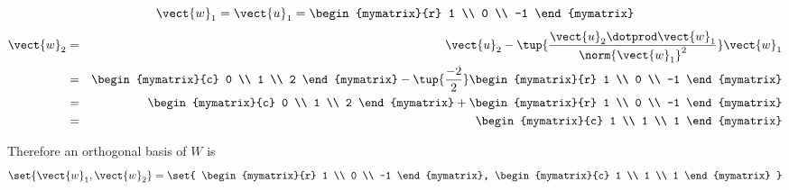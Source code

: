 \begin{solution}
\[
\vect{w}_1 = \vect{u}_1 = \begin{mymatrix}{r}
1 \\
0 \\
-1
\end{mymatrix}
\]
\begin{eqnarray*}
\vect{w}_2 &=& \vect{u}_2 - \tup{\frac{ \vect{u}_2 \dotprod \vect{w}_1}{\norm{\vect{w}_1}^2} }  \vect{w}_1\\
&=& \begin{mymatrix}{c}
0 \\
1 \\
2
\end{mymatrix}
-
\tup{
\frac{-2}{2}}
\begin{mymatrix}{r}
1 \\
0 \\
-1
\end{mymatrix}
\\
&=&
\begin{mymatrix}{c}
0 \\
1 \\
2
\end{mymatrix} 
+
\begin{mymatrix}{r}
1 \\
0 \\
-1
\end{mymatrix} \\
&=&
\begin{mymatrix}{c}
1 \\
1 \\
1
\end{mymatrix}
\end{eqnarray*}

Therefore an orthogonal basis of $W$ is 
\[
\set{\vect{w}_1, \vect{w}_2 } = 
\set{
\begin{mymatrix}{r}
1 \\
0 \\
-1
\end{mymatrix}, 
\begin{mymatrix}{c}
1 \\
1 \\
1
\end{mymatrix}
}
\]


\end{solution}
